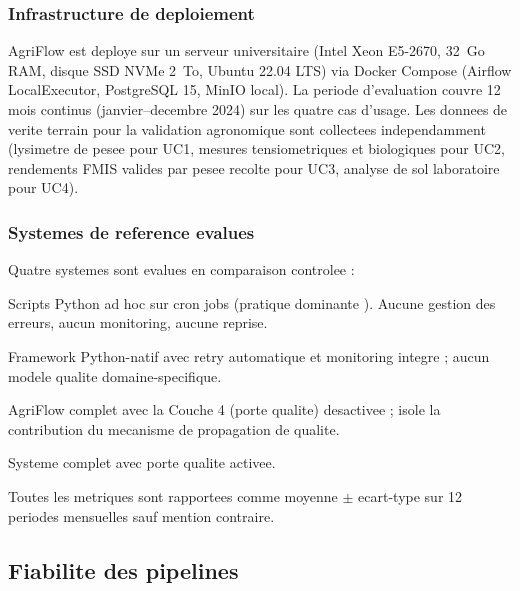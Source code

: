 \documentclass[12pt,a4paper]{article}
\theoremstyle{plain}
\theoremstyle{definition}
\theoremstyle{remark}
\begin{document}
\subsubsection{Infrastructure de deploiement}

AgriFlow est deploye sur un serveur universitaire
(Intel Xeon E5-2670, 32~Go RAM, disque SSD NVMe 2~To, Ubuntu 22.04 LTS)
via Docker Compose (Airflow LocalExecutor, PostgreSQL 15, MinIO local).
La periode d'evaluation couvre 12 mois continus (janvier--decembre 2024)
sur les quatre cas d'usage. Les donnees de verite terrain pour la
validation agronomique sont collectees independamment
(lysimetre de pesee pour UC1, mesures tensiometriques et biologiques
pour UC2, rendements FMIS valides par pesee recolte pour UC3,
analyse de sol laboratoire pour UC4).

\subsubsection{Systemes de reference evalues}

Quatre systemes sont evalues en comparaison controlee :

\begin{description}[leftmargin=1.5em,style=nextline]
  \item[Scripts.] Scripts Python ad hoc sur cron jobs
    (pratique dominante \cite{pipeline_survey_2024}).
    Aucune gestion des erreurs, aucun monitoring, aucune reprise.
  \item[Prefect.] Framework Python-natif avec retry automatique
    et monitoring integre ; aucun modele qualite domaine-specifique.
  \item[AgriFlow-SansQG.] AgriFlow complet avec la Couche 4
    (porte qualite) desactivee ; isole la contribution du mecanisme
    de propagation de qualite.
  \item[AgriFlow.] Systeme complet avec porte qualite activee.
\end{description}

Toutes les metriques sont rapportees comme moyenne $\pm$ ecart-type
sur 12 periodes mensuelles sauf mention contraire.

\subsection{Fiabilite des pipelines}
\end{document}

